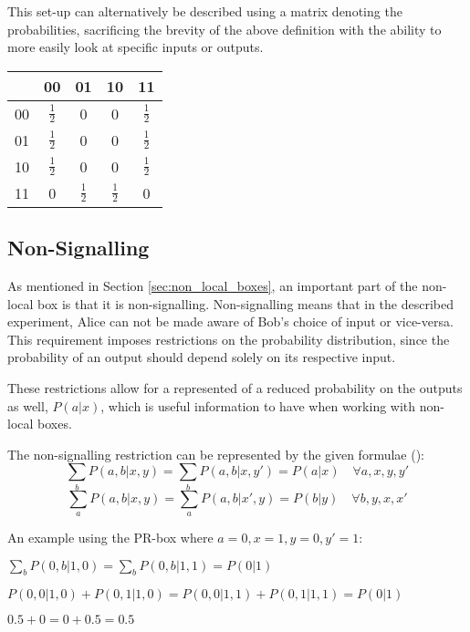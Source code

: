\documentclass[report.tex]{subfiles}
\begin{document}
This set-up can alternatively be described using a matrix denoting the 
probabilities, sacrificing the brevity of the above definition with the ability
to more easily look at specific inputs or outputs.

\begin{center}
\begin{tabular}{l | c c c c}
  & 00 & 01 & 10 & 11 \\
  \hline
  00 & \(\frac{1}{2}\) & 0 & 0 & \(\frac{1}{2}\) \\
  01 & \(\frac{1}{2}\) & 0 & 0 & \(\frac{1}{2}\) \\
  10 & \(\frac{1}{2}\) & 0 & 0 & \(\frac{1}{2}\) \\
  11 & 0 & \(\frac{1}{2}\) & \(\frac{1}{2}\) & 0 \\
\end{tabular}
\end{center}

\subsection{Non-Signalling} %
\label{sub:non_signalling}
As mentioned in Section \ref{sec:non_local_boxes}, an important part of the
non-local box is that it is non-signalling. Non-signalling means that in the
described experiment, Alice can not be made aware of Bob's choice of input or
vice-versa. This requirement imposes restrictions on the probability
distribution, since the probability of an output should depend solely on its
respective input. 

These restrictions allow for a represented of a reduced probability on the
outputs as well, \(P(a | x)\), which is useful information to have when
working with non-local boxes.

The non-signalling restriction can be represented by the given formulae
(\cite[Section~II.A]{PhysRevA.71.022101}):
\[\sum_{b} P(a, b | x, y) = \sum_{b} P(a, b | x, y') = P(a | x) 
\quad \forall a, x, y, y'\]
\[\sum_{a} P(a, b | x, y) = \sum_{a} P(a, b | x', y) = P(b | y) 
\quad \forall b, y, x, x'\]

An example using the PR-box where \(a = 0, x = 1, y = 0, y' = 1\):

\(\sum_{b} P(0, b | 1, 0) = \sum_{b} P(0, b | 1, 1) = P(0 | 1)\)

\(P(0, 0 | 1, 0) + P(0, 1 | 1, 0) = P(0, 0 | 1, 1) + P(0, 1 | 1, 1) = P(0 | 1)\)

\(0.5 + 0 = 0 + 0.5 = 0.5\)
\end{document}
